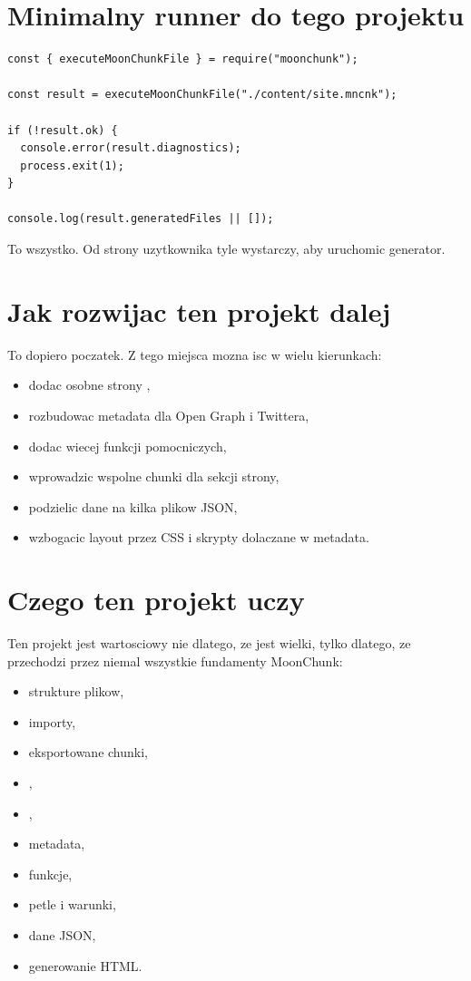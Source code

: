 \section{Minimalny runner do tego projektu}
\begin{lstlisting}[style=basecode,caption={Plik run.js dla projektu}]
const { executeMoonChunkFile } = require("moonchunk");

const result = executeMoonChunkFile("./content/site.mncnk");

if (!result.ok) {
  console.error(result.diagnostics);
  process.exit(1);
}

console.log(result.generatedFiles || []);
\end{lstlisting}

To wszystko. Od strony uzytkownika tyle wystarczy, aby uruchomic generator.

\section{Jak rozwijac ten projekt dalej}
To dopiero poczatek. Z tego miejsca mozna isc w wielu kierunkach:

\begin{itemize}
  \item dodac osobne strony ,
  \item rozbudowac metadata dla Open Graph i Twittera,
  \item dodac wiecej funkcji pomocniczych,
  \item wprowadzic wspolne chunki dla sekcji strony,
  \item podzielic dane na kilka plikow JSON,
  \item wzbogacic layout przez CSS i skrypty dolaczane w metadata.
\end{itemize}

\section{Czego ten projekt uczy}
Ten projekt jest wartosciowy nie dlatego, ze jest wielki, tylko dlatego, ze przechodzi
przez niemal wszystkie fundamenty MoonChunk:

\begin{itemize}
  \item strukture plikow,
  \item importy,
  \item eksportowane chunki,
  \item {},
  \item {},
  \item metadata,
  \item funkcje,
  \item petle i warunki,
  \item dane JSON,
  \item generowanie HTML.
\end{itemize}

